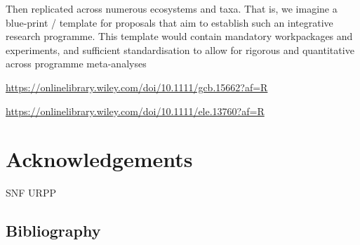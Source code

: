 \documentclass{article}
\begin{document}
Then replicated across numerous ecosystems and taxa. That is, we imagine
a blue-print / template for proposals that aim to establish such an
integrative research programme. This template would contain mandatory
workpackages and experiments, and sufficient standardisation to allow
for rigorous and quantitative across programme meta-analyses

\url{https://onlinelibrary.wiley.com/doi/10.1111/gcb.15662?af=R}

\url{https://onlinelibrary.wiley.com/doi/10.1111/ele.13760?af=R}

\hypertarget{acknowledgements}{%
\section{Acknowledgements}\label{acknowledgements}}

SNF URPP

\hypertarget{bibliography}{%
\subsection*{Bibliography}\label{bibliography}}
\end{document}
